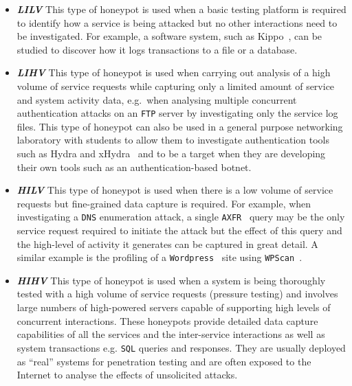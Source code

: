 \documentclass[10pt,journal]{IEEEtran}
\begin{document}
\begin{itemize}

  \item \noindent \emph{\textbf{LILV}} This type of honeypot is used when a
    basic testing platform is required to identify how a service is being
    attacked but no other interactions need to be investigated. For example, a
    software system, such as Kippo~\cite{SH:15}, can be studied to
    discover how it logs transactions to a file or a database. 

  \item \noindent \emph{\textbf{LIHV}} This type of honeypot is used when
    carrying out analysis of a high volume of service requests while capturing
    only a limited amount of service and system activity data, e.g.\ when
    analysing multiple concurrent authentication attacks on an
    \texttt{FTP} server by investigating only the service log files. This type of
    honeypot can also be used in a general purpose networking laboratory with
    students to allow them to investigate authentication tools such as Hydra
    and xHydra~\cite{RS:15} and to be a target when they are developing their
    own tools such as an authentication-based botnet.

  \item \noindent \emph{\textbf{HILV}} This type of honeypot is used when there
    is a low volume of service requests but fine-grained data capture is
    required. For example, when investigating a \texttt{DNS} enumeration
    attack, a single \texttt{AXFR}~\cite{EL:10} query may be the only service
    request required to initiate the attack but the effect of this query and
    the high-level of activity it generates can be captured in great detail.  A
    similar example is the profiling of a \texttt{Wordpress}~\cite{WP:17} site
    using \texttt{WPScan}~\cite{WT:17}.

  \item \noindent \emph{\textbf{HIHV}} This type of honeypot is used when a
    system is being thoroughly tested with a high volume of service requests
    (pressure testing) and involves large numbers of high-powered servers capable
    of supporting high levels of concurrent interactions. These honeypots
    provide detailed data capture capabilities of all the services and the
    inter-service interactions as well as system transactions e.g. \texttt{SQL}
    queries and responses. They are usually deployed as ``real'' systems for
    penetration testing and are often exposed to the Internet to analyse the
    effects of unsolicited attacks.  

\end{itemize}
\end{document}
